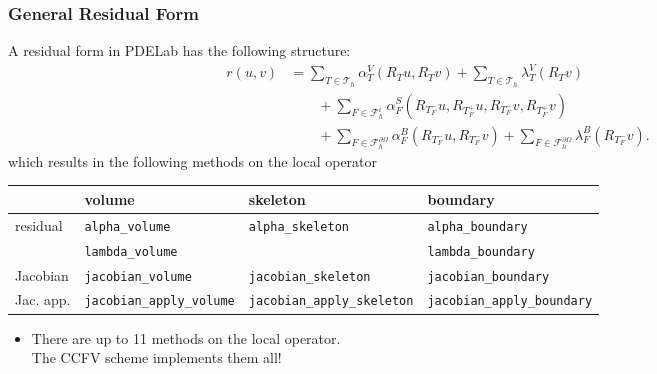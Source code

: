 \documentclass[aspectratio=169,11pt]{beamer}
\theoremstyle{definition}
\begin{document}
\begin{frame}
\frametitle{General Residual Form}
A residual form in PDELab has the following structure:
\begin{equation*}
\begin{split}
r(u,v) &=
\sum_{T\in\mathcal{T}_h} \alpha_T^V(R_T u, R_T v)
+ \sum_{T\in\mathcal{T}_h} \lambda_T^V(R_T v) \\
&\qquad+ \sum_{F\in\mathcal{F}_h^i} \alpha_F^S(R_{T_F^-} u,R_{T_F^+} u, R_{T_F^-} v, R_{T_F^+} v)\\
&\qquad+ \sum_{F\in\mathcal{F}_h^{\partial\Omega}} \alpha_F^B(R_{T_F^-} u, R_{T_F^-} v)
+ \sum_{F\in\mathcal{F}_h^{\partial\Omega}} \lambda_F^B(R_{T_F^-} v) .
\end{split}\label{eq:GeneralResidualForm}
\end{equation*}
which results in the following methods on the local operator
\begin{center}
\scriptsize
\begin{tabular}{l|l|l|l}
    & volume & skeleton & boundary \\
\hline
residual    & \lstinline!alpha_volume! & \lstinline!alpha_skeleton! & \lstinline!alpha_boundary! \\
                & \lstinline!lambda_volume! & & \lstinline!lambda_boundary! \\
\hline
Jacobian  & \lstinline!jacobian_volume! & \lstinline!jacobian_skeleton! & \lstinline!jacobian_boundary! \\
\hline
Jac.  app.  & \lstinline!jacobian_apply_volume! & \lstinline!jacobian_apply_skeleton! &
\lstinline!jacobian_apply_boundary!
\end{tabular}
\end{center}
\begin{itemize}
\item[\rightarrownice] There are up to 11 methods on the local
  operator.\\The CCFV scheme implements them all!
\end{itemize}
\end{frame}
\end{document}
